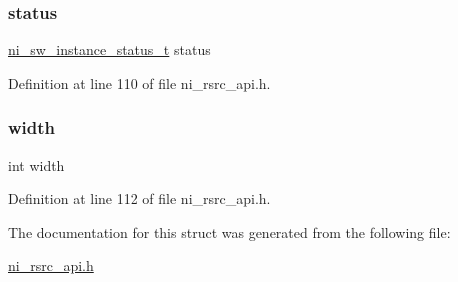 \mbox{\label{struct__ni__sw__instance__info_a1edc0e5686dc061d581baf18b9afcefd}} 
\subsubsection{\texorpdfstring{status}{status}}
{\footnotesize\ttfamily \mbox{\hyperlink{ni__rsrc__api_8h_a64a7b6cabb90ef404ab5425542fefe20}{ni\+\_\+sw\+\_\+instance\+\_\+status\+\_\+t}} status}



Definition at line 110 of file ni\+\_\+rsrc\+\_\+api.\+h.

\mbox{\label{struct__ni__sw__instance__info_a2474a5474cbff19523a51eb1de01cda4}} 
\subsubsection{\texorpdfstring{width}{width}}
{\footnotesize\ttfamily int width}



Definition at line 112 of file ni\+\_\+rsrc\+\_\+api.\+h.



The documentation for this struct was generated from the following file\+:\begin{DoxyCompactItemize}
\item 
\mbox{\hyperlink{ni__rsrc__api_8h}{ni\+\_\+rsrc\+\_\+api.\+h}}\end{DoxyCompactItemize}

